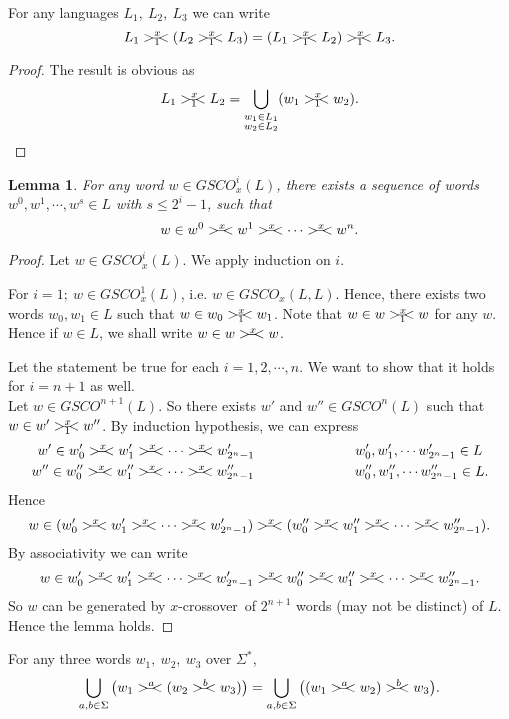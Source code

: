 \documentclass{llncs}
\newtheorem{lem}{Lemma}
\newcommand{\sa}{crossover~}
\newcommand{\sg}{\Sigma}
\newcommand{\rs}{\hspace{-3.5mm}-\hspace{-2mm}<}
\begin{document}
\begin{corollary}
For any languages $L_1,~L_2,~L_3$ we can write
\[L_1>_1^x\rs(L_2>_1^x\rs L_3)=(L_1>_1^x\rs L_2)>_1^x\rs L_3.\]
\end{corollary}
\begin{proof}
The result is obvious as
\[L_1>_1^x\rs L_2=\bigcup_{\substack{w_1\in L_1\\w_2\in L_2}} (w_1>_1^x\rs w_2).\]
\end{proof}
\begin{lem}\label{as}
For any word $w\in GSCO_x^i(L)$, there exists a sequence of words
$w^0,w^1,\cdots,w^s\in L$ with $s\leq 2^i-1$, such that
\[w\in w^0>^x\rs w^1>^x\rs\cdots>^x\rs w^n.\]
\end{lem}
\begin{proof}
Let $w\in GSCO_x^i(L)$. We apply induction on $i$.
\par For $i=1;~w\in GSCO_x^1(L)$, i.e. $w\in GSCO_x(L,L)$. Hence, there exists
two words $w_0,w_1\in L $ such that \newline$w\in w_0>_1^x\rs w_1$. Note that
$w\in w>_1^x\rs w$ for any $w$. Hence if  $w\in L$, we shall write $w\in w>^x\rs w$.\\
\par Let the statement be true for each $i=1,2,\cdots, n$. We want to show
that it holds for $i=n+1$ as well.\\

Let $w\in GSCO^{n+1}(L)$. So there exists $w'$ and $w''\in
GSCO^n(L)$ such that $w\in w'>_1^x\rs w''$. By induction hypothesis,
we can express
\begin{gather*}
w'\in w_0'>^x\rs w_1'>^x\rs\cdots>^x\rs w_{2^n-1}'\hspace{1in}w_0',w_1',\cdots w_{2^n-1}'\in L\\
w''\in w_0''>^x\rs w_1''>^x\rs\cdots>^x\rs
w_{2^n-1}''\hspace{1in}w_0'',w_1'',\cdots w_{2^n-1}''\in L.
\end{gather*}
Hence
\[ w\in(w_0'>^x\rs w_1'>^x\rs\cdots>^x\rs w_{2^n-1}')>^x\rs(w_0''>^x\rs w_1''>^x\rs\cdots>^x\rs w_{2^n-1}'').\]
By associativity we can write
\[ w\in w_0'>^x\rs w_1'>^x\rs\cdots>^x\rs w_{2^n-1}'>^x\rs w_0''>^x\rs w_1''>^x\rs\cdots>^x\rs w_{2^n-1}''.\]
So $w$ can be generated by $x$-\sa of $2^{n+1}$ words  (may not be distinct) of $L$. Hence the lemma holds.
\end{proof}
\begin{theorem}\label{tt}
For any three words $w_1,~w_2,~w_3$ over $\sg^*$,
\[\bigcup_{a,b\in\sg}\big(w_1>^a\rs(w_2>^b\rs w_3)\big)=\bigcup_{a,b\in\sg}\big((w_1>^a\rs w_2)>^b\rs w_3\big).\]
\end{theorem}
\end{document}
